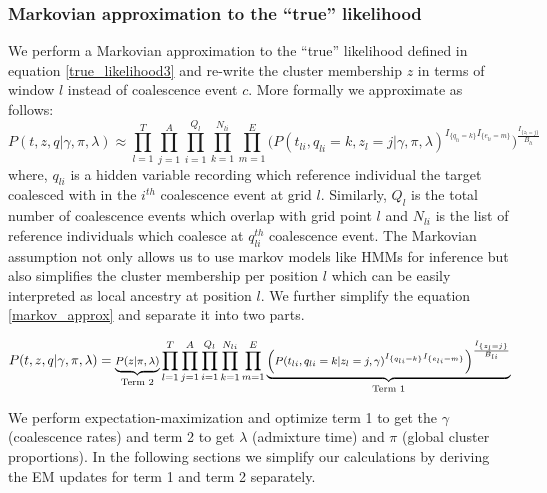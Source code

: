 \subsubsection{Markovian approximation to the ``true'' likelihood}
We perform a Markovian approximation to the ``true'' likelihood defined in equation \ref{true_likelihood3} and re-write the cluster membership $z$ in terms of window $l$ instead of coalescence event $c$. More formally we approximate as follows:
\begin{equation}
    P (t,z,q \vert \gamma, \pi, \lambda) \approx \prod_{l =1}^{T} \prod_{j = 1}^A \prod_{i = 1}^{Q_l} \prod_{k =1}^{N_{li}} \prod_{m = 1}^E \Big( P(t_{li}, q_{li} = k, z_l = j \vert \gamma, \pi, \lambda) ^ {I_{\{q_{l i} = k\}}  I_{\{e_{l i} = m\}}} \Big) ^{\frac{I_{\{z_l = j\}}}{B_{li}}}
    \label{markov_approx}
\end{equation}
where, $q_{li}$ is a hidden variable recording which reference individual the target coalesced with in the $i^{th}$ coalescence event at grid $l$. Similarly, $Q_{l}$ is the total number of coalescence events which overlap with grid point $l$ and $N_{li}$ is the list of reference individuals which coalesce at $q_{li}^{th}$ coalescence event. The Markovian assumption not only allows us to use markov models like HMMs for inference but also simplifies the cluster membership per position $l$ which can be easily interpreted as local ancestry at position $l$. We further simplify the equation \ref{markov_approx} and separate it into two parts.

\begin{equation}
    \footnotesize
    P (t,z,q \vert \gamma, \pi, \lambda) = \underbrace{P(z \vert \pi, \lambda)}_{\text{Term 2}} \prod_{l =1}^{T} \prod_{j = 1}^A \prod_{i = 1}^{Q_l} \prod_{k =1}^{N_{li}} \prod_{m = 1}^E \underbrace{\Big( P(t_{li}, q_{li} = k \vert z_l = j, \gamma) ^ {I_{\{q_{l i} = k\}}  I_{\{e_{l i} = m\}}} \Big) ^{\frac{I_{\{z_l = j\}}}{B_{li}}}}_{\text{Term 1}}
    \label{eq:term1_term2}
\end{equation}

We perform expectation-maximization and optimize term 1 to get the $\gamma$ (coalescence rates) and term 2 to get $\lambda$ (admixture time) and $\pi$ (global cluster proportions). In the following sections we simplify our calculations by deriving the EM updates for term 1 and term 2 separately. 

